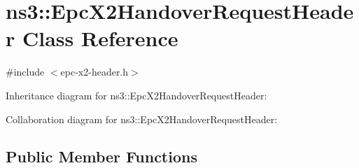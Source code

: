 \hypertarget{classns3_1_1EpcX2HandoverRequestHeader}{}\section{ns3\+:\+:Epc\+X2\+Handover\+Request\+Header Class Reference}
\label{classns3_1_1EpcX2HandoverRequestHeader}


{\ttfamily \#include $<$epc-\/x2-\/header.\+h$>$}



Inheritance diagram for ns3\+:\+:Epc\+X2\+Handover\+Request\+Header\+:


Collaboration diagram for ns3\+:\+:Epc\+X2\+Handover\+Request\+Header\+:
\subsection*{Public Member Functions}
